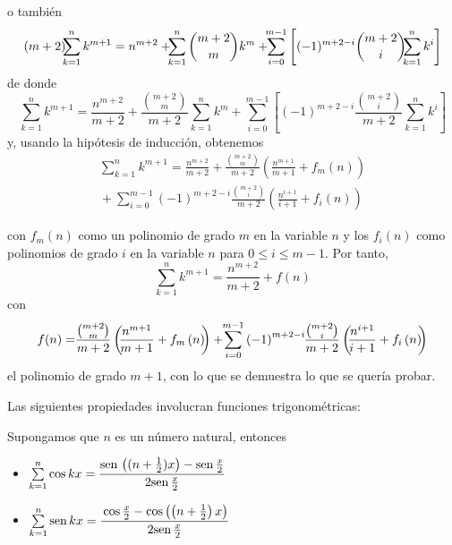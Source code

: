 o también
{\small
\[
\left(m+2\right)\hspace{-0.15cm}\sum_{k=1}^{n}k^{m+1}=n^{m+2}+\hspace{-0.15cm}\sum_{k=1}^{n}\binom{m+2}{m}%
k^{m}+\hspace{-0.15cm}\sum_{i=0}^{m-1}\left[( -1) ^{m+2-i}\binom{m+2}{i}\hspace{-0.15cm}\sum_{k=1}^{n}k^{i}\right]
\]
}
de donde
{\small
\[
\sum_{k=1}^{n}k^{m+1}=\frac{n^{m+2}}{m+2}+\frac{\binom{m+2}{m}}{m+2}%
\sum_{k=1}^{n}k^{m}+\sum_{i=0}^{m-1}\left[\left( -1\right) ^{m+2-i}\frac{\binom{m+2}{i}}{m+2}\sum_{k=1}^{n}k^{i}\right]
\]
}
y, usando la hipótesis de inducción, obtenemos
{\small
\begin{align*}
\sum_{k=1}^{n}k^{m+1}
= \frac{n^{m+2}}{m+2}
+ \frac{\binom{m+2}{m}}{m+2} \left( \frac{n^{m+1}}{m+1} + f_{m}(n) \right) \\
\hspace{0pt}
+ \sum_{i=0}^{m-1} (-1)^{m+2-i} \frac{\binom{m+2}{i}}{m+2} \left( \frac{n^{i+1}}{i+1} + f_{i}(n) \right)
\end{align*}
}

con $f_{m}\left( n\right) $ como un polinomio de grado $m$ en la variable $n$ y los $f_{i}\left( n\right) $ como polinomios de grado $i$ en la variable $n$ para $0\leq i\leq m-1$. Por tanto,
\[
\sum_{k=1}^{n}k^{m+1}=\frac{n^{m+2}}{m+2}+f(n)
\]
con
\[
f(n)=\hspace{-0.1cm}\frac{\binom{m+2}{m}}{m+2}\left(\hspace{-0.1cm} \frac{n^{m+1}}{m+1}+f_{m}\left( n\right) \hspace{-0.1cm}\right)
+\hspace{-0.1cm}\sum_{i=0}^{m-1}\left( -1\right) ^{m+2-i}\hspace{-0.1cm}\frac{\binom{m+2}{i}}{m+2}\left(\hspace{-0.1cm}
\frac{n^{i+1}}{i+1}+f_{i}\left( n\right)\hspace{-0.1cm} \right)
\]
el polinomio de grado $m+1$, con lo que se demuestra lo que se quería probar. 


Las siguientes propiedades involucran funciones trigonométricas:

\begin{teorema}\label{SumSenoCoseno} \textnormal{Supongamos que \textit{$n$} es un número natural, entonces}
\begin{itemize}[leftmargin=1.2em,   itemindent=0pt,labelwidth=,labelsep=0.5em,]
	
\item[\textnormal{a)}] $\sum\limits_{k=1}^{n}\cos kx=\cfrac{\text{\rm sen}\,\left(( n+\frac{1}{2})x\right)-\text{\rm sen}\,\frac{x}{2} }{2\text{\rm sen}\,\frac{x}{2} }$
\item[\textnormal{b)}] $\sum\limits_{k=1}^{n}\text{\rm sen}\, kx=\cfrac{\cos \frac{x}{2} -\cos
\left( \left( n+\frac{1}{2}\right) x\right) }{2\text{\rm sen}\,\frac{x}{2}}$
\end{itemize}
\end{teorema}


